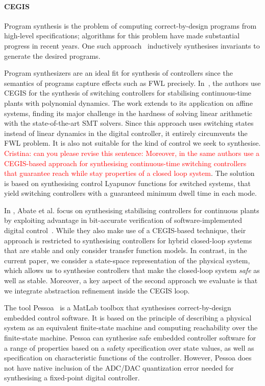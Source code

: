 \documentclass[runningheads,a4paper]{llncs}
\begin{document}
\paragraph{CEGIS}

Program synthesis is the problem of computing correct-by-design programs
from high-level specifications; algorithms for this problem have made
substantial progress in recent years.  One such
approach~\cite{itzhaky2010simple} inductively synthesises invariants to
generate the desired programs.

Program synthesizers are an ideal fit for synthesis of %
controllers since the semantics of programs capture effects such as FWL
precisely.  In~\cite{DBLP:conf/cdc/RavanbakhshS15}, the authors use CEGIS
for the synthesis of switching controllers for stabilising continuous-time
plants with polynomial dynamics.  The work extends to its application on
affine systems, finding its major challenge in the hardness of solving
linear arithmetic with the state-of-the-art SMT solvers.  Since this
approach uses switching states instead of linear dynamics in the digital
controller, it entirely circumvents the FWL problem.  It is also not
suitable for the kind of control we seek to synthesise.
\textcolor{red}{Cristina: can you please revise this sentence:
Moreover, in \cite{DBLP:conf/emsoft/RavanbakhshS16} the same authors 
use a CEGIS-based approach for synthesising continuous-time switching
controllers that guarantee reach while stay properties of a closed
loop system}. The solution is based on synthesising control Lyapunov
functions for switched systems, that yield switching controllers with
a guaranteed minimum dwell time in each mode.

In \cite{DBLP:journals/corr/AbateBCCDKK16}, Abate et al.  focus on
synthesising stabilising controllers for continuous plants
by exploiting advantage in bit-accurate verification of software-implemented 
digital control~\cite{Bessa16}.  While they also make use of a CEGIS-based 
technique, their approach is restricted to synthesising controllers for hybrid 
closed-loop systems that are stable and only consider transfer function models.  
In contrast, in the current paper, we consider a state-space
representation of the physical system, which allows us to synthesise controllers that
make the closed-loop system \emph{safe} as well as stable.  Moreover, 
a key aspect of the second approach we evaluate
is that we integrate abstraction
refinement inside the CEGIS loop.

The tool Pessoa~\cite{mazo2010pessoa} is a MatLab toolbox that synthesises correct-by-design
embedded control software. It is based on the principle of describing a physical system
as an equivalent finite-state machine and computing reachability over the finite-state 
machine. Pessoa can synthesise safe embedded controller software for a range of properties based on a safety specification over state
values, as well as specification on characteristic functions of the controller. 
However, Pessoa does not have native inclusion of the ADC/DAC quantization error needed for
synthesising a fixed-point digital controller.
\end{document}
